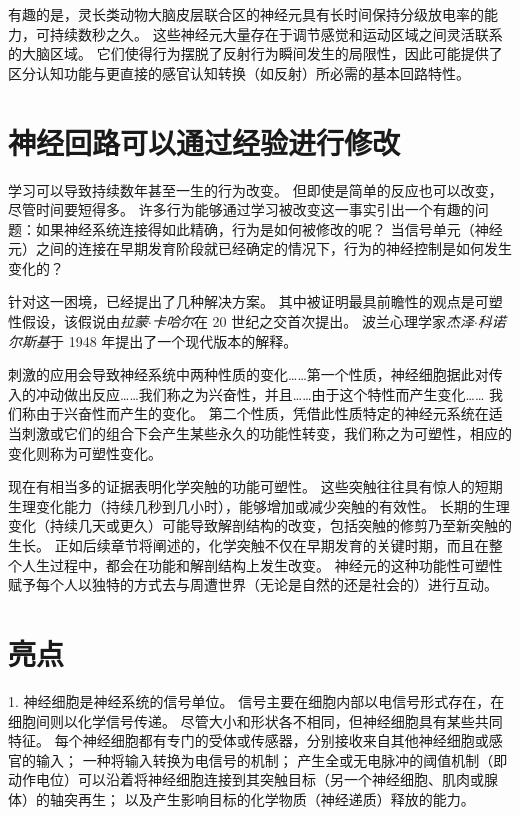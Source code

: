 有趣的是，灵长类动物大脑皮层联合区的神经元具有长时间保持分级放电率的能力，可持续数秒之久。 
这些神经元大量存在于调节感觉和运动区域之间灵活联系的大脑区域。 
它们使得行为摆脱了反射行为瞬间发生的局限性，因此可能提供了区分认知功能与更直接的感官认知转换（如反射）所必需的基本回路特性。


\section{神经回路可以通过经验进行修改}
学习可以导致持续数年甚至一生的行为改变。 
但即使是简单的反应也可以改变，尽管时间要短得多。 
许多行为能够通过学习被改变这一事实引出一个有趣的问题：如果神经系统连接得如此精确，行为是如何被修改的呢？ 
当信号单元（神经元）之间的连接在早期发育阶段就已经确定的情况下，行为的神经控制是如何发生变化的？


针对这一困境，已经提出了几种解决方案。 
其中被证明最具前瞻性的观点是可塑性假设，该假说由\textit{拉蒙$\cdot$卡哈尔}在 20 世纪之交首次提出。 
波兰心理学家\textit{杰泽$\cdot$科诺尔斯基}于 1948 年提出了一个现代版本的解释。


刺激的应用会导致神经系统中两种性质的变化……第一个性质，神经细胞据此对传入的冲动做出反应……我们称之为兴奋性，并且……由于这个特性而产生变化…… 我们称由于兴奋性而产生的变化。
第二个性质，凭借此性质特定的神经元系统在适当刺激或它们的组合下会产生某些永久的功能性转变，我们称之为可塑性，相应的变化则称为可塑性变化。


现在有相当多的证据表明化学突触的功能可塑性。 
这些突触往往具有惊人的短期生理变化能力（持续几秒到几小时），能够增加或减少突触的有效性。 
长期的生理变化（持续几天或更久）可能导致解剖结构的改变，包括突触的修剪乃至新突触的生长。 
正如后续章节将阐述的，化学突触不仅在早期发育的关键时期，而且在整个人生过程中，都会在功能和解剖结构上发生改变。
神经元的这种功能性可塑性赋予每个人以独特的方式去与周遭世界（无论是自然的还是社会的）进行互动。



\section{亮点}
1. 神经细胞是神经系统的信号单位。
信号主要在细胞内部以电信号形式存在，在细胞间则以化学信号传递。
尽管大小和形状各不相同，但神经细胞具有某些共同特征。
每个神经细胞都有专门的受体或传感器，分别接收来自其他神经细胞或感官的输入； 
一种将输入转换为电信号的机制；
产生全或无电脉冲的阈值机制（即动作电位）可以沿着将神经细胞连接到其突触目标（另一个神经细胞、肌肉或腺体）的轴突再生；
以及产生影响目标的化学物质（神经递质）释放的能力。



